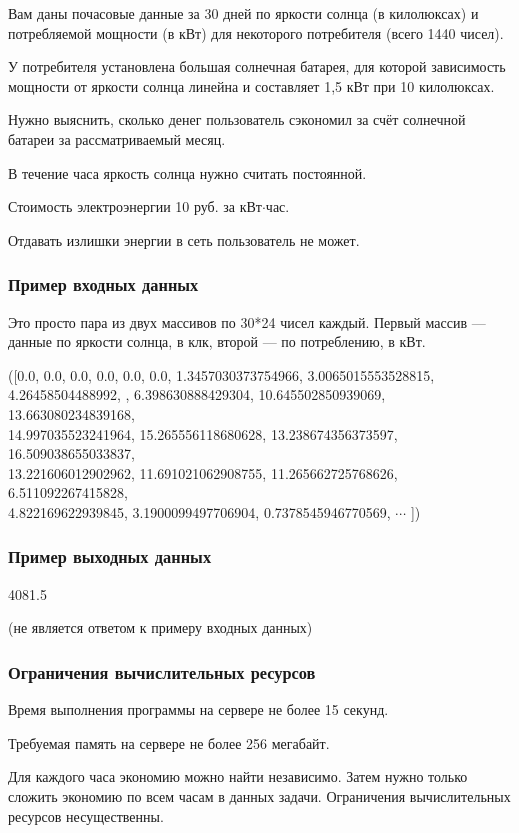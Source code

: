 
Вам даны почасовые данные за 30 дней по яркости солнца (в килолюксах) и потребляемой мощности (в кВт) для некоторого потребителя (всего 1440 чисел).

У потребителя установлена большая солнечная батарея, для которой зависимость мощности от яркости солнца линейна и составляет 1,5 кВт при 10 килолюксах.

Нужно выяснить, сколько денег пользователь сэкономил за счёт солнечной батареи за рассматриваемый месяц.

В течение часа яркость солнца нужно считать постоянной.

Стоимость электроэнергии 10 руб. за кВт$\cdot$час.

Отдавать излишки энергии в сеть пользователь не может.

\subsubsection*{Пример входных данных}
Это просто пара из двух массивов по 30*24 чисел каждый. Первый массив — данные по яркости солнца, в клк, второй — по потреблению, в кВт.

\noindent([0.0, 0.0, 0.0, 0.0, 0.0, 0.0, 1.3457030373754966, 3.0065015553528815, 4.26458504488992, , 6.398630888429304, 10.645502850939069, 13.663080234839168, \\
14.997035523241964, 15.265556118680628, 13.238674356373597, 16.509038655033837, \\
13.221606012902962, 11.691021062908755, 11.265662725768626, 6.511092267415828, \\
4.822169622939845, 3.1900099497706904, 0.7378545946770569, $\cdots$ ])

\subsubsection*{Пример выходных данных}

4081.5

(не является ответом к примеру входных данных)

\subsubsection*{Ограничения вычислительных ресурсов}

Время выполнения программы на сервере не более 15 секунд.

Требуемая память на сервере не более 256 мегабайт.

\solutionSection

Для каждого часа экономию можно найти независимо. Затем нужно только сложить экономию по всем часам в данных задачи. Ограничения вычислительных ресурсов несущественны.

